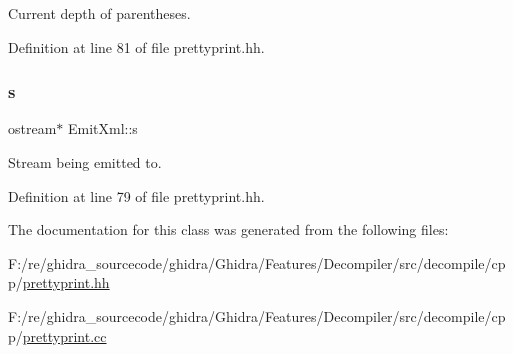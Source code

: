 Current depth of parentheses. 



Definition at line 81 of file prettyprint.\+hh.

\mbox{\label{class_emit_xml_adfd933b95bdda7bac877f5273d22b53c}} 
\subsubsection{\texorpdfstring{s}{s}}
{\footnotesize\ttfamily ostream$\ast$ Emit\+Xml\+::s\hspace{0.3cm}{\ttfamily [protected]}}



Stream being emitted to. 



Definition at line 79 of file prettyprint.\+hh.



The documentation for this class was generated from the following files\+:\begin{DoxyCompactItemize}
\item 
F\+:/re/ghidra\+\_\+sourcecode/ghidra/\+Ghidra/\+Features/\+Decompiler/src/decompile/cpp/\mbox{\hyperlink{prettyprint_8hh}{prettyprint.\+hh}}\item 
F\+:/re/ghidra\+\_\+sourcecode/ghidra/\+Ghidra/\+Features/\+Decompiler/src/decompile/cpp/\mbox{\hyperlink{prettyprint_8cc}{prettyprint.\+cc}}\end{DoxyCompactItemize}
